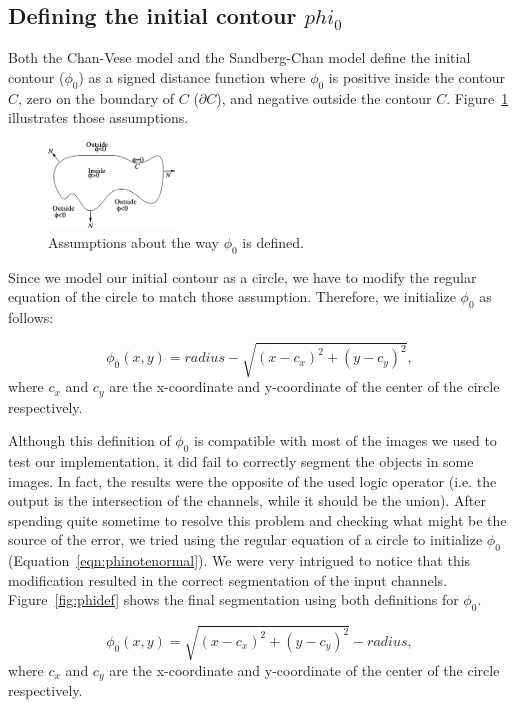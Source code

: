 \documentclass[10pt,twocolumn,letterpaper]{article}
\begin{document}
\subsection{Defining the initial contour $phi_0$}
Both the Chan-Vese model and the Sandberg-Chan model define the initial contour ($\phi_0$) as a signed distance function where $\phi_0$ is positive inside the
contour $C$, zero on the boundary of $C$ ($\partial C$), and negative outside the contour $C$. Figure~\ref{fig:phinote} illustrates those assumptions.

\begin{figure}[t]
\centering
\includegraphics[width=0.3\textwidth]{phinote.png}
\caption{Assumptions about the way $\phi_0$ is defined.}
\label{fig:phinote}
\end{figure}

Since we model our initial contour as a circle, we have to modify the regular equation of the circle to match those assumption. Therefore, we initialize
$\phi_0$ as follows:

\begin{equation}
\label{eqn:phinote}
\phi_{0} (x, y) = radius - \sqrt{ (x - c_x)^2 + (y - c_y)^2 },
\end{equation}
where $c_x$ and $c_y$ are the x-coordinate and y-coordinate of the center of the circle respectively.

Although this definition of $\phi_0$ is compatible with most of the images we used to test our implementation, it did fail to correctly segment the objects in
some images. In fact, the results were the opposite of the used logic operator (i.e. the output is the intersection of the channels, while it should be the
union). After spending quite sometime to resolve this problem and checking what might be the source of the error, we tried using the regular equation of a
circle to initialize $\phi_0$ (Equation~\ref{eqn:phinotenormal}). We were very intrigued to notice that this modification resulted in the correct segmentation
of the input channels. Figure~\ref{fig:phidef} shows the final segmentation using both definitions for $\phi_0$.

\begin{equation}
\label{eqn:phinotenormal}
\phi_{0} (x, y) = \sqrt{ (x - c_x)^2 + (y - c_y)^2 } - radius,
\end{equation}
where $c_x$ and $c_y$ are the x-coordinate and y-coordinate of the center of the circle respectively.
\end{document}
